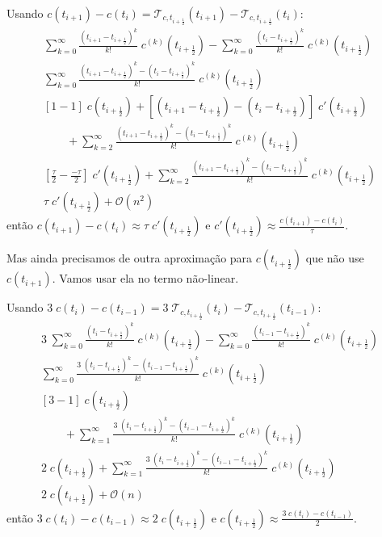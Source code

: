 \documentclass[a4paper]{article}
\begin{document}
Usando
\(
    c(t_{i+1}) - c(t_i)
    =
    \mathcal{T}_{c,t_{i+\frac12}}(t_{i+1})
    - \mathcal{T}_{c,t_{i+\frac12}}(t_i)
\):
\[ \begin{array}{l} \displaystyle
    \sum_{k=0}^{\infty} \frac{(t_{i+1} - t_{i+\frac12})^k}{k!} \; c^{(k)}(t_{i+\frac12})
    - \sum_{k=0}^{\infty} \frac{(t_i - t_{i+\frac12})^k}{k!} \; c^{(k)}(t_{i+\frac12})
    \\ \displaystyle
    \sum_{k=0}^{\infty} \frac{(t_{i+1} - t_{i+\frac12})^k - (t_i - t_{i+\frac12})^k}{k!} \; c^{(k)}(t_{i+\frac12})
    \\ \displaystyle
    \left[1 - 1\right] \; c(t_{i+\frac12})
    + \left[ (t_{i+1} - t_{i+\frac12}) - (t_i - t_{i+\frac12}) \right] \; c'(t_{i+\frac12})
    \\\qquad \displaystyle
    + \sum_{k=2}^{\infty} \frac{(t_{i+1} - t_{i+\frac12})^k - (t_i - t_{i+\frac12})^k}{k!} \; c^{(k)}(t_{i+\frac12})
    \\ \displaystyle
    \left[ \frac{\tau}{2} - \frac{-\tau}{2} \right] \; c'(t_{i+\frac12})
    + \sum_{k=2}^{\infty} \frac{(t_{i+1} - t_{i+\frac12})^k - (t_i - t_{i+\frac12})^k}{k!} \; c^{(k)}(t_{i+\frac12})
    \\ \displaystyle
    \tau \; c'(t_{i+\frac12})
    + \mathcal{O}(n^2)
\end{array} \]
então \(
    c(t_{i+1}) - c(t_i)
    \approx
    \tau \; c'(t_{i+\frac12})
\) e \(
    c'(t_{i+\frac12})
    \approx
    \frac{c(t_{i+1}) - c(t_i)}{\tau}
\).

Mas ainda precisamos de outra aproximação
para \(c(t_{i+\frac12})\)
que não use \(c(t_{i+1})\).
Vamos usar ela no termo não-linear.

Usando
\(
    3 \; c(t_i) - c(t_{i-1})
    =
    3 \; \mathcal{T}_{c,t_{i+\frac12}}(t_i)
    - \mathcal{T}_{c,t_{i+\frac12}}(t_{i-1})
\):
\[ \begin{array}{l} \displaystyle
    3 \; \sum_{k=0}^{\infty} \frac{(t_i - t_{i+\frac12})^k}{k!} \; c^{(k)}(t_{i+\frac12})
    - \sum_{k=0}^{\infty} \frac{(t_{i-1} - t_{i+\frac12})^k}{k!} \; c^{(k)}(t_{i+\frac12})
    \\ \displaystyle
    \sum_{k=0}^{\infty} \frac{3 \; (t_i - t_{i+\frac12})^k - (t_{i-1} - t_{i+\frac12})^k}{k!} \; c^{(k)}(t_{i+\frac12})
    \\ \displaystyle
    \left[3 - 1\right] \; c(t_{i+\frac12})
    \\\qquad \displaystyle
    + \sum_{k=1}^{\infty} \frac{3 \; (t_i - t_{i+\frac12})^k - (t_{i-1} - t_{i+\frac12})^k}{k!} \; c^{(k)}(t_{i+\frac12})
    \\ \displaystyle
    2 \; c(t_{i+\frac12})
    + \sum_{k=1}^{\infty} \frac{3 \; (t_i - t_{i+\frac12})^k - (t_{i-1} - t_{i+\frac12})^k}{k!} \; c^{(k)}(t_{i+\frac12})
    \\ \displaystyle
    2 \; c(t_{i+\frac12})
    + \mathcal{O}(n)
\end{array} \]
então \(
    3 \; c(t_i) - c(t_{i-1})
    \approx
    2 \; c(t_{i+\frac12})
\) e \(
    c(t_{i+\frac12})
    \approx
    \frac{3 \; c(t_i) - c(t_{i-1})}{2}
\).
\end{document}
